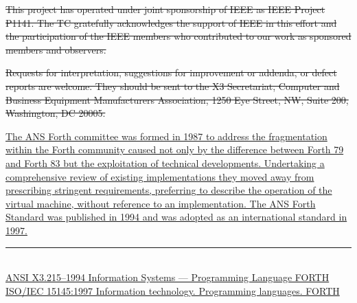 \sout{%
This project has operated under joint sponsorship of IEEE as IEEE Project P1141.
The TC gratefully acknowledges the support of IEEE in this effort and the
participation of the IEEE members who contributed to our work as sponsored
members and observers.}

\sout{%
Requests for interpretation, suggestions for improvement or addenda, or defect
reports are welcome. They should be sent to the X3 Secretariat, Computer and
Business Equipment Manufacturers Association, 1250 Eye Street, NW, Suite 200,
Washington, DC 20005.}

\uline{%
The ANS Forth committee was formed in 1987 to address the fragmentation
within the Forth community caused not only by the difference between Forth 79
and Forth 83 but the exploitation of technical de\-vel\-op\-ments.  Undertaking a
comprehensive review of existing implementations they moved away from
prescribing stringent requirements, preferring to describe the operation of the
virtual machine, without reference to an implementation.  The ANS Forth
Standard was published in 1994\raisebox{1ex}{\scriptsize 1} and was adopted as an
international standard in 1997\raisebox{1ex}{\scriptsize 2}.}
\cbend


\enlargethispage{4ex}
\vfill
\cbstart
\rule{100pt}{1pt} \\[-0.5ex]
{\footnotesize
\raisebox{1ex}{\scriptsize 1} \uline{ANSI X3.215--1994 Information Systems --- Programming Language FORTH} \\
\raisebox{1ex}{\scriptsize 2} \uline{ISO/IEC 15145:1997 Information technology.  Programming languages.  FORTH} \\
}
\cbend